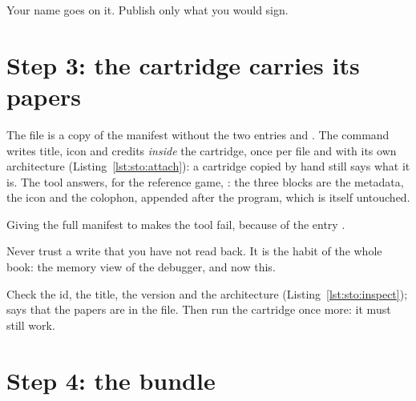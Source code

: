 \begin{prgconcept}
Your name goes on it. Publish only what you would sign.
\end{prgconcept}

\section{Step 3: the cartridge carries its papers}


The file  is a copy of the manifest without the two
entries  and . The command
 writes title, icon and credits \emph{inside} the
cartridge, once per file and with its own architecture
(Listing~\ref{lst:sto:attach}): a cartridge copied by hand still says what it
is. The tool answers, for the reference game, :
the three blocks are the metadata, the icon and the colophon, appended after
the program, which is itself untouched.

\begin{prgwarn}
Giving the full manifest to  makes the tool fail, because
of the entry .
\end{prgwarn}


\begin{prgconcept}
Never trust a write that you have not read back. It is the habit of the
whole book: the memory view of the debugger, and now this.
\end{prgconcept}

Check the id, the title, the version and the architecture
(Listing~\ref{lst:sto:inspect});  says that the papers
are in the file. Then run the cartridge once more: it must still work.

\section{Step 4: the bundle}


